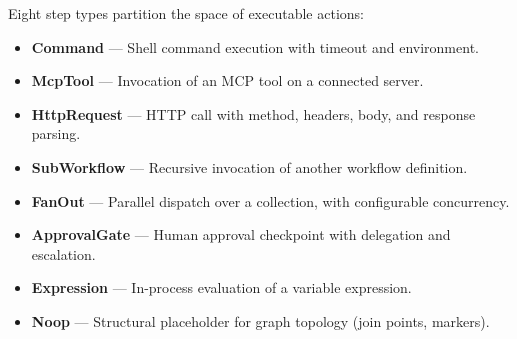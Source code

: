 \documentclass[10pt, twocolumn]{article}
\begin{document}
Eight step types partition the space of executable actions:
\begin{itemize}[nosep, leftmargin=*]
  \item \textbf{Command} --- Shell command execution with timeout and environment.
  \item \textbf{McpTool} --- Invocation of an MCP tool on a connected server.
  \item \textbf{HttpRequest} --- HTTP call with method, headers, body, and response parsing.
  \item \textbf{SubWorkflow} --- Recursive invocation of another workflow definition.
  \item \textbf{FanOut} --- Parallel dispatch over a collection, with configurable concurrency.
  \item \textbf{ApprovalGate} --- Human approval checkpoint with delegation and escalation.
  \item \textbf{Expression} --- In-process evaluation of a variable expression.
  \item \textbf{Noop} --- Structural placeholder for graph topology (join points, markers).
\end{itemize}
\end{document}

